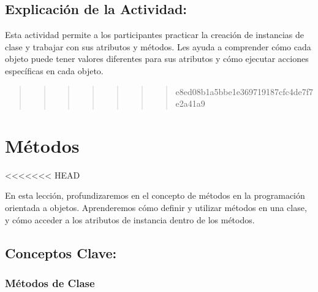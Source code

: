 \documentclass[
  a4paper,
  onepage,
  openany]{scrreprt}
\begin{document}
\hypertarget{explicaciuxf3n-de-la-actividad-49}{%
\section{Explicación de la
Actividad:}\label{explicaciuxf3n-de-la-actividad-49}}

Esta actividad permite a los participantes practicar la creación de
instancias de clase y trabajar con sus atributos y métodos. Les ayuda a
comprender cómo cada objeto puede tener valores diferentes para sus
atributos y cómo ejecutar acciones específicas en cada objeto.

\begin{quote}
\begin{quote}
\begin{quote}
\begin{quote}
\begin{quote}
\begin{quote}
\begin{quote}
e8ed08b1a5bbe1e369719187cfc4de7f7e2a41a9
\end{quote}
\end{quote}
\end{quote}
\end{quote}
\end{quote}
\end{quote}
\end{quote}

\hypertarget{muxe9todos-2}{%
\chapter{Métodos}\label{muxe9todos-2}}

\textless\textless\textless\textless\textless\textless\textless{} HEAD

En esta lección, profundizaremos en el concepto de métodos en la
programación orientada a objetos. Aprenderemos cómo definir y utilizar
métodos en una clase, y cómo acceder a los atributos de instancia dentro
de los métodos.

\hypertarget{conceptos-clave-52}{%
\section{Conceptos Clave:}\label{conceptos-clave-52}}

\hypertarget{muxe9todos-de-clase}{%
\subsection{Métodos de Clase}\label{muxe9todos-de-clase}}
\end{document}
